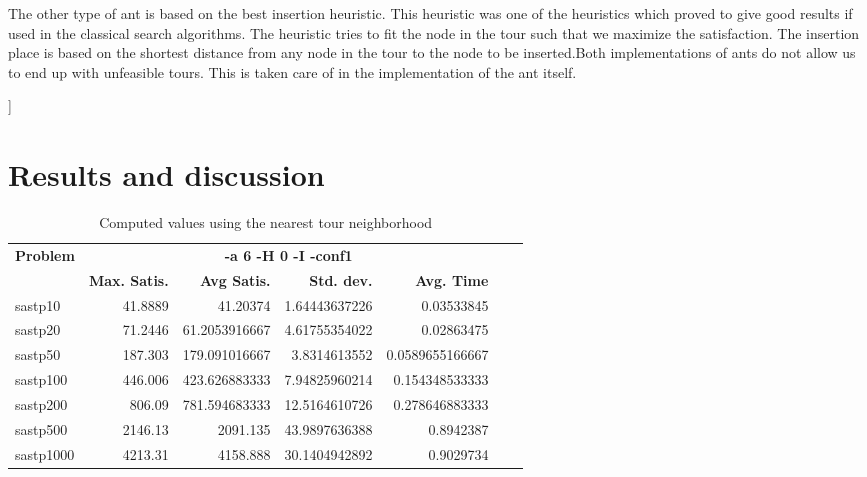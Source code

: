 \documentclass{article}
\begin{document}
The other type of ant is based on the best insertion heuristic. This heuristic was one of the heuristics which proved to give good results if used in the classical search algorithms. The heuristic tries to fit the node in the tour such that we maximize the satisfaction. The insertion place is based on the shortest distance from any node in the tour to the node to be inserted.Both implementations of ants do not allow us to end up with unfeasible tours. This is taken care of in the implementation of the ant itself. 





]


\section{Results and discussion}


\begin{table}[b!]
  \vspace{-6mm}%
  \caption{Computed values using the nearest tour neighborhood}
  \label{tab:NearestTour}
  \setlength{\tabcolsep}{1.4mm}
  \centering
  \begin{tabular}{lrrrrrr}
   \multirow{2}{*}{\bfseries Problem} &
      \multicolumn{4}{c}{\bfseries -a 6 -H 0 -I -conf1 } \\
    &
    \bfseries Max. Satis. &
    \bfseries Avg Satis. &
    \bfseries Std. dev. &
    \bfseries Avg. Time 
    \\\hline
    sastp10 & 41.8889 & 41.20374 & 1.64443637226 & 0.03533845 \\ 
	sastp20 & 71.2446 & 61.2053916667 & 4.61755354022 & 0.02863475 \\ 
	sastp50 & 187.303 & 179.091016667 & 3.8314613552 & 0.0589655166667 \\ 
	sastp100 & 446.006 & 423.626883333 & 7.94825960214 & 0.154348533333 \\ 
	sastp200 & 806.09 & 781.594683333 & 12.5164610726 & 0.278646883333 \\ 
	sastp500 & 2146.13 & 2091.135 & 43.9897636388 & 0.8942387 \\ 
	sastp1000 & 4213.31 & 4158.888 & 30.1404942892 & 0.9029734 

    \\\hline
  \end{tabular}

\end{table}
\end{document}
